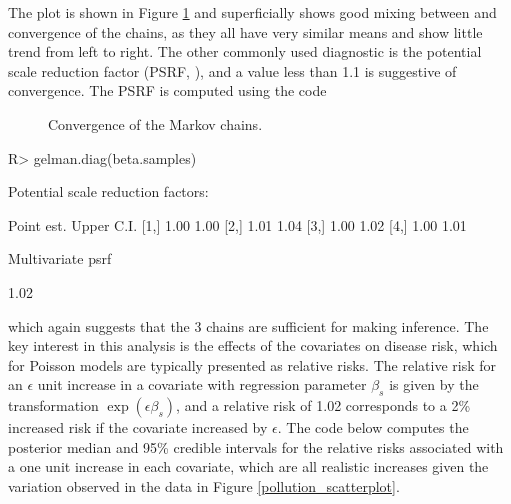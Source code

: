 \documentclass[article, nojss]{jss}
\begin{document}
The plot is shown in Figure \ref{pollution_mcmc} and superficially shows good mixing between and convergence of the chains, as they all have very similar means and show little trend from left to right. The other commonly used diagnostic is the potential scale reduction factor (PSRF, \cite{gelman2013}), and a value less than 1.1 is suggestive of convergence. The PSRF is computed using the code


\begin{figure}
\centering 
{}
\caption{Convergence of the Markov chains.\label{pollution_mcmc}}
\end{figure} 




\begin{CodeInput}
R>  gelman.diag(beta.samples)
\end{CodeInput}


\begin{CodeOutput}
Potential scale reduction factors:

     Point est. Upper C.I.
[1,]       1.00       1.00
[2,]       1.01       1.04
[3,]       1.00       1.02
[4,]       1.00       1.01

Multivariate psrf

1.02
\end{CodeOutput}

which again suggests that the 3 chains are sufficient for making inference. The key interest in this analysis is the effects of the covariates on disease risk, which for Poisson models are typically presented as relative risks. The relative risk for an $\epsilon$ unit increase in a covariate with regression parameter $\beta_s$ is given by the transformation $\exp(\epsilon\beta_s)$, and a relative risk of 1.02 corresponds to a 2\% increased risk if the covariate increased by $\epsilon$. The code below computes the posterior median and 95\% credible intervals  for the relative risks associated with a one unit increase in each covariate, which are all realistic increases given the variation observed in the data in Figure \ref{pollution_scatterplot}.
\end{document}
